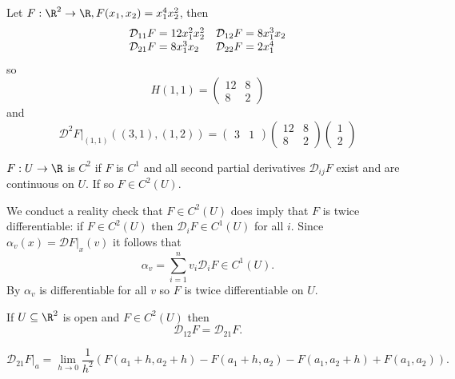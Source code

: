 \documentclass[a4paper]{article}
\newcommand*{\D}{\mathcal{D}}
\theoremstyle{definition}
\begin{document}
\begin{eg}
  Let \(F: \R^2 \to \R, F(x_1, x_2) = x_1^4x_2^2\), then
  \[
    \begin{array}[h]{l l}
      \D_{11} F = 12 x_1^2 x_2^2 & \D_{12} F = 8x_1^3 x_2 \\
      \D_{21} F = 8 x_1^3 x_2 & \D_{22} F = 2 x_1^4
    \end{array}
  \]
  so
  \[
    H(1, 1) =
    \begin{pmatrix}
      12 & 8 \\
      8 & 2
    \end{pmatrix}
  \]
  and
  \[
    \D^2 F|_{(1, 1)} ((3, 1), (1, 2)) =
    \begin{pmatrix}
      3 & 1
    \end{pmatrix}
    \begin{pmatrix}
      12 & 8 \\
      8 & 2
    \end{pmatrix}
    \begin{pmatrix}
      1 \\
      2
    \end{pmatrix}
  \]
\end{eg}

\begin{definition}[\(C^2\) space]
  \(F: U \to \R\) is \(C^2\) if \(F\) is \(C^1\) and all second partial derivatives \(\D_{ij} F\) exist and are continuous on \(U\). If so \(F \in C^2(U)\).
\end{definition}

\begin{remark}
  We conduct a reality check that \(F \in C^2(U)\) does imply that \(F\) is twice differentiable: if \(F \in C^2(U)\) then \(\D_i F \in C^1(U)\) for all \(i\). Since \(\alpha_v(x) = \D F|_x(v)\) it follows that
  \[
    \alpha_v = \sum_{i = 1}^{n} v_i \D_i F \in C^1(U).
  \]
  By  \(\alpha_v\) is differentiable for all \(v\) so \(F\) is twice differentiable on \(U\).
\end{remark}

\begin{theorem}
  \label{thm:symmetry of mixed partials}
  If \(U \subseteq \R^2\) is open and \(F \in C^2(U)\) then
  \[
    \D_{12} F = \D_{21} F.
  \]
\end{theorem}

\begin{lemma}
  \[
    \D_{21} F|_a = \lim_{h \to 0} \frac{1}{h^2} \left( F(a_1 + h, a_2 + h) - F(a_1 + h, a_2) - F(a_1, a_2 + h) + F(a_1, a_2) \right).
  \]
\end{lemma}
\end{document}
